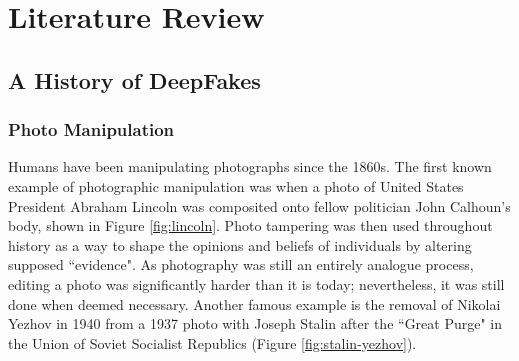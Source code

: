\chapter{Literature Review}
\label{ch:background}

\section{A History of DeepFakes}


\subsection{Photo Manipulation}

Humans have been manipulating photographs since the 1860s. The first known example of photographic manipulation was when a photo of United States President Abraham Lincoln was composited onto fellow politician John Calhoun's body\cite{singh2018art}, shown in Figure \ref{fig:lincoln}. Photo tampering was then used throughout history as a way to shape the opinions and beliefs of individuals by altering supposed ``evidence". As photography was still an entirely analogue process, editing a photo was significantly harder than it is today; nevertheless, it was still done when deemed necessary. Another famous example is the removal of Nikolai Yezhov in 1940 from a 1937 photo with Joseph Stalin after the ``Great Purge" in the Union of Soviet Socialist Republics (Figure \ref{fig:stalin-yezhov}).

